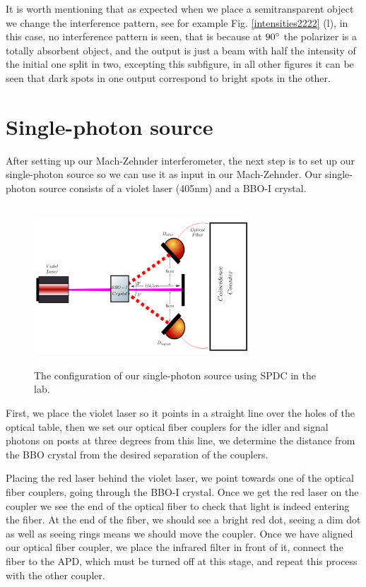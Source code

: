 \documentclass[12pt]{book}
\begin{document}
It is worth mentioning that as expected when we place a  semitransparent object we change the interference pattern, see for example Fig. \ref{intensities2222}  (l), in this case, no interference pattern is seen, that is because at $90\degree$ the polarizer is a totally absorbent object,  and the output is just a beam with half the intensity of the initial one split in two, excepting this subfigure, in all other figures it can be seen that dark spots in one output correspond to bright spots in the other.

 
\section{Single-photon source}

After setting up our Mach-Zehnder interferometer, the next step is to set up our single-photon source so we can use it as input in our Mach-Zehnder. Our single-photon source consists of a violet laser (405nm) and a BBO-I crystal.


\begin{figure}[t!]
\center
\includegraphics[width=8cm,height=6cm]{images/sPDC.png}
\caption{The configuration of our single-photon source using SPDC in the lab.}
\end{figure} 

First, we place the violet laser so it points in a straight line over the holes of the optical table, then we set our optical fiber couplers for the idler and signal photons on posts at three degrees from this line, we determine the distance from the BBO crystal from the desired separation of the couplers.






Placing the red laser behind the violet laser, we point towards one of the optical fiber couplers, going through the BBO-I crystal. Once we get the red laser on the coupler we see the end of the optical fiber to check that light is indeed entering the fiber. At the end of the fiber, we should see a bright red dot, seeing a dim dot as well as seeing rings means we should move the coupler. Once we have aligned our optical fiber coupler, we place the infrared filter in front of it, connect the fiber to the APD, which must be turned off at this stage, and repeat this process with the other coupler.
\end{document}
